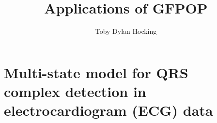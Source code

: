 \documentclass[12pt]{article}
\begin{document}


\title{Applications of GFPOP}
\author{Toby Dylan Hocking}
\maketitle


\section{Multi-state model for QRS complex detection in electrocardiogram (ECG) data}
\end{document}
